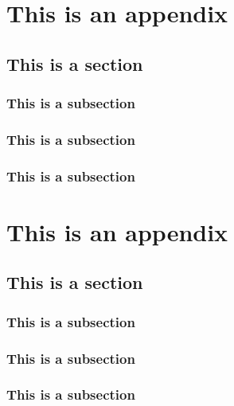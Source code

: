 \documentclass[11pt,oneside]{book}
\begin{document}
% 
\begin{appendices}
\chapter{This is an appendix}

\section{This is a section}

\subsection{This is a subsection}
\subsection{This is a subsection}
\subsection{This is a subsection}

\lipsum[1-10]



\chapter{This is an appendix}

\section{This is a section}

\subsection{This is a subsection}
\subsection{This is a subsection}
\subsection{This is a subsection}

\lipsum[1-10]


\end{appendices}
\end{document}
